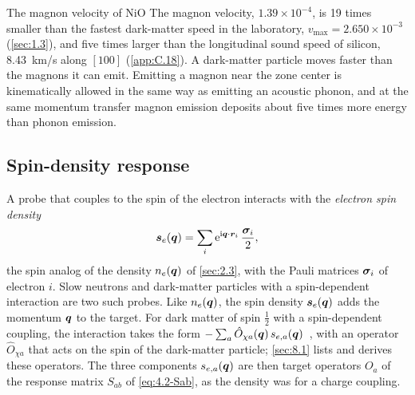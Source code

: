 \begin{workedexample}{The magnon velocity of NiO}
The magnon velocity, $1.39\times10^{-4}$, is 19 times smaller than the fastest dark-matter speed in the laboratory, $v_{\mathrm{max}} = 2.650\times10^{-3}$ (\cref{sec:1.3}), and five times larger than the longitudinal sound speed of silicon, \SI{8.43}{km/s} along $[100]$ (\cref{app:C.18}). A dark-matter particle moves faster than the magnons it can emit. Emitting a magnon near the zone center is kinematically allowed in the same way as emitting an acoustic phonon, and at the same momentum transfer magnon emission deposits about five times more energy than phonon emission.
\end{workedexample}

\subsection{Spin-density response}

A probe that couples to the spin of the electron interacts with the \emph{electron spin density}
\begin{equation}
  \bm{s}_e(\bm{q}) = \sum_i\mathrm{e}^{\mathrm{i}\bm{q}\cdot\bm{r}_i}\,\frac{\bm{\sigma}_i}{2} ,
  \label{eq:7.1-se}
\end{equation}
the spin analog of the density $n_e(\bm{q})$ of \cref{sec:2.3}, with the Pauli matrices $\bm{\sigma}_i$ of electron $i$. Slow neutrons and dark-matter particles with a spin-dependent interaction are two such probes. Like $n_e(\bm{q})$, the spin density $\bm{s}_e(\bm{q})$ adds the momentum $\bm{q}$ to the target. For dark matter of spin $\frac12$ with a spin-dependent coupling, the interaction takes the form $-\sum_a\hat O_{\chi a}(\bm{q})\,s_{e,a}(\bm{q})$~\cite[Eq.~(4)]{trickle2020detecting}, with an operator $\hat O_{\chi a}$ that acts on the spin of the dark-matter particle; \cref{sec:8.1} lists and derives these operators. The three components $s_{e,a}(\bm{q})$ are then target operators $O_a$ of the response matrix $S_{ab}$ of \cref{eq:4.2-Sab}, as the density was for a charge coupling.

